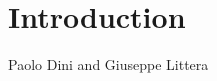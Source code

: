 \chapter{Introduction}
\label{ch:Introduction}

\vspace{-1cm}
\begin{center}
Paolo Dini and Giuseppe Littera
\end{center}













